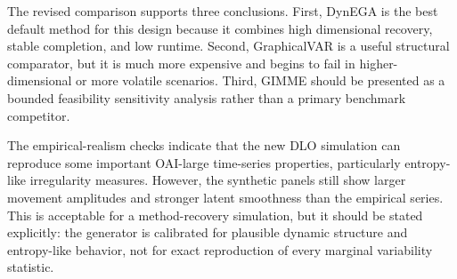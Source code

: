 \documentclass[11pt]{article}
\begin{document}
The revised comparison supports three conclusions. First, DynEGA is the best
default method for this design because it combines high dimensional recovery,
stable completion, and low runtime. Second, GraphicalVAR is a useful structural
comparator, but it is much more expensive and begins to fail in higher-dimensional
or more volatile scenarios. Third, GIMME should be presented as a bounded
feasibility sensitivity analysis rather than a primary benchmark competitor.

The empirical-realism checks indicate that the new DLO simulation can reproduce
some important OAI-large time-series properties, particularly entropy-like
irregularity measures. However, the synthetic panels still show larger movement
amplitudes and stronger latent smoothness than the empirical series. This is
acceptable for a method-recovery simulation, but it should be stated explicitly:
the generator is calibrated for plausible dynamic structure and entropy-like
behavior, not for exact reproduction of every marginal variability statistic.
\end{document}
